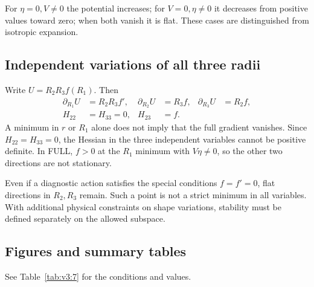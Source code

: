 For $\eta=0,V\ne0$ the potential increases; for $V=0,\eta\ne0$
it decreases from positive values toward zero; when both vanish
it is flat. These cases are distinguished from isotropic expansion.

\subsection{Independent variations of all three radii}
Write $U=R_2R_3f(R_1)$. Then
\begin{equation}
\begin{aligned}
\partial_{R_1}U&=R_2R_3 f',&
\partial_{R_2}U&=R_3 f,&
\partial_{R_3}U&=R_2 f,\\
H_{22}&=H_{33}=0,&H_{23}&=f.
\end{aligned}
\tag{E-03}\label{eq:E-03}
\end{equation}
A minimum in $r$ or $R_1$ alone does not imply that the full gradient
vanishes. Since $H_{22}=H_{33}=0$, the Hessian in the three independent
variables cannot be positive definite.
In FULL, $f>0$ at the $R_1$ minimum with $V\eta\ne0$, so the other
two directions are not stationary.

Even if a diagnostic action satisfies the special conditions $f=f'=0$,
flat directions in $R_2,R_3$ remain. Such a point is not a strict
minimum in all variables.
With additional physical constraints on shape variations, stability
must be defined separately on the allowed subspace.

\subsection{Figures and summary tables}
See Table~\ref{tab:v3:7} for the conditions and values.


\FloatBarrier
